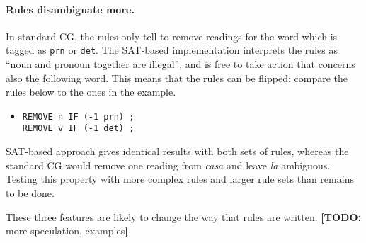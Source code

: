 \documentclass[11pt]{article}
\newcommand{\todo}[1]{{\color{cyan}\textbf{[TODO: }#1\textbf{]}}}
\begin{document}
\paragraph{Rules disambiguate more.}
In standard CG, the rules only tell to remove readings for the word which is tagged as 
\texttt{prn} or \texttt{det}. The SAT-based implementation interprets the rules as ``noun and pronoun together are illegal'', and is free to take action that concerns also the following word.
This means that the rules can be flipped: compare the rules below to the ones in the example.

\begin{itemize}
\item [] \texttt{REMOVE n IF (-1 prn) ;} \\
             \texttt{REMOVE v IF (-1 det) ;}
\end{itemize}

SAT-based approach gives identical results with both sets of rules,
whereas the standard CG would remove one reading from \emph{casa} and leave \emph{la} ambiguous.
Testing this property with more complex rules and larger rule sets than remains to be done.



These three features are likely to change the way that rules are written. \todo{more speculation, examples}
\end{document}
